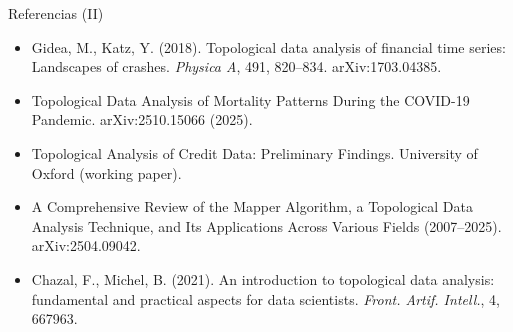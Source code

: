\documentclass[aspectratio=169,11pt]{beamer}
\begin{document}
\begin{frame}{Referencias (II)}
  \footnotesize
  \begin{itemize}
    \item Gidea, M., Katz, Y. (2018). Topological data analysis of financial time series: Landscapes of crashes. \textit{Physica A}, 491, 820--834. arXiv:1703.04385.
    \item Topological Data Analysis of Mortality Patterns During the COVID-19 Pandemic. arXiv:2510.15066 (2025).
    \item Topological Analysis of Credit Data: Preliminary Findings. University of Oxford (working paper).
    \item A Comprehensive Review of the Mapper Algorithm, a Topological Data Analysis Technique, and Its Applications Across Various Fields (2007--2025). arXiv:2504.09042.
    \item Chazal, F., Michel, B. (2021). An introduction to topological data analysis: fundamental and practical aspects for data scientists. \textit{Front. Artif. Intell.}, 4, 667963.
  \end{itemize}
\end{frame}
\end{document}
